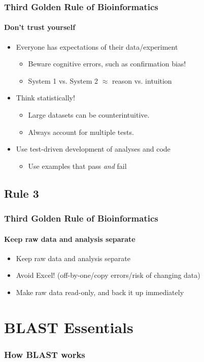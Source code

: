 \documentclass[table]{beamer}
\begin{document}
  \begin{frame}
    \frametitle{Third Golden Rule of Bioinformatics}
    \framesubtitle{Don't trust yourself}
	\begin{itemize}
	  \item Everyone has expectations of their data/experiment
	    \begin{itemize}
	      \item Beware cognitive errors, such as confirmation bias!
	      \item System 1 vs. System 2 $\approx$ reason vs. intuition
	    \end{itemize}
	  \item Think statistically! 
	    \begin{itemize}
	      \item Large datasets can be counterintuitive.
	      \item Always account for multiple tests.
	    \end{itemize}
	  \item Use test-driven development of analyses and code
	    \begin{itemize}
	      \item Use examples that pass \textit{and} fail
	    \end{itemize}	  
	\end{itemize}
  \end{frame}

  \subsection{Rule 3}
  \begin{frame}
    \frametitle{Third Golden Rule of Bioinformatics}
    \framesubtitle{Keep raw data and analysis separate}
	\begin{itemize}
	  \item Keep raw data and analysis separate
	  \item Avoid Excel! (off-by-one/copy errors/risk of changing data)
	  \item Make raw data read-only, and back it up immediately
	\end{itemize}
  \end{frame}


  \section{BLAST Essentials}
  
    \begin{frame}
     \frametitle{How BLAST works}
    \end{frame}
   
\end{document}

